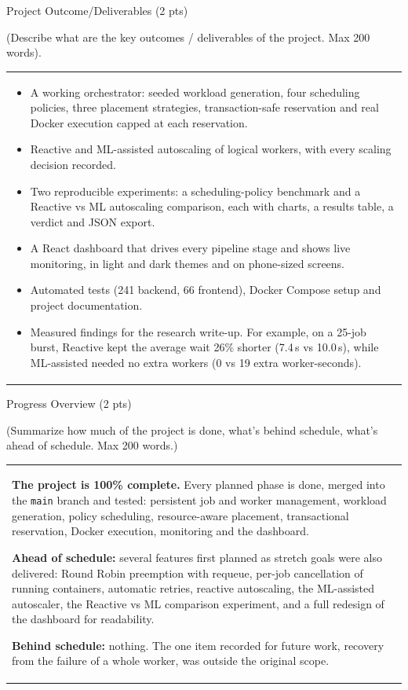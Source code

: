 \documentclass[12pt,a4paper]{article}
\newcommand{\sectiontitle}[1]{%
    {\color{GEUBlue}
    \fontsize{18}{22}\selectfont #1}
}
\newcommand{\instruction}[1]{%
    {\color{InstructionGrey}
    \fontsize{10.5}{13}\selectfont #1}
}
\newcommand{\answerbox}[2]{%
    \noindent
    \begin{tabularx}{\textwidth}{
        |>{\raggedright\arraybackslash}X|}
        \hline
        \parbox[t]{\dimexpr\linewidth-12pt\relax}{
            \vspace{5pt}
            \fontsize{10.5}{13}\selectfont #2
            \par\vspace{6pt}
        }\\
        \hline
    \end{tabularx}
}
\begin{document}
\sectiontitle{Project Outcome/Deliverables (2 pts)}

\vspace{0.05cm}
\instruction{(Describe what are the key outcomes / deliverables of the project. Max 200 words).}

\vspace{0.35cm}
\answerbox{3.35cm}{%
\begin{itemize}
    \item A working orchestrator: seeded workload generation, four scheduling policies, three placement
    strategies, transaction-safe reservation and real Docker execution capped at each reservation.
    \item Reactive and ML-assisted autoscaling of logical workers, with every scaling decision recorded.
    \item Two reproducible experiments: a scheduling-policy benchmark and a Reactive vs ML autoscaling
    comparison, each with charts, a results table, a verdict and JSON export.
    \item A React dashboard that drives every pipeline stage and shows live monitoring, in light and
    dark themes and on phone-sized screens.
    \item Automated tests (241 backend, 66 frontend), Docker Compose setup and project documentation.
    \item Measured findings for the research write-up. For example, on a 25-job burst, Reactive kept the
    average wait 26\% shorter (7.4\,s vs 10.0\,s), while ML-assisted needed no extra workers
    (0 vs 19 extra worker-seconds).
\end{itemize}}

\vspace{0.75cm}

\sectiontitle{Progress Overview (2 pts)}

\vspace{0.05cm}
\instruction{(Summarize how much of the project is done, what's behind schedule,
what's ahead of schedule. Max 200 words.)}

\vspace{0.25cm}
\answerbox{4.45cm}{%
\textbf{The project is 100\% complete.} Every planned phase is done, merged into the \texttt{main}
branch and tested: persistent job and worker management, workload generation, policy scheduling,
resource-aware placement, transactional reservation, Docker execution, monitoring and the dashboard.

\vspace{4pt}
\textbf{Ahead of schedule:} several features first planned as stretch goals were also delivered:
Round Robin preemption with requeue, per-job cancellation of running containers, automatic retries,
reactive autoscaling, the ML-assisted autoscaler, the Reactive vs ML comparison experiment, and a full
redesign of the dashboard for readability.

\vspace{4pt}
\textbf{Behind schedule:} nothing. The one item recorded for future work, recovery from the failure of a
whole worker, was outside the original scope.}
\end{document}
